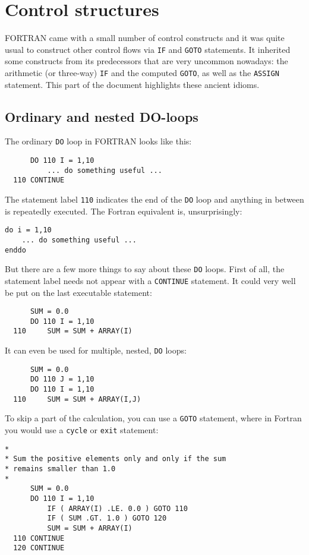 \section{Control structures}
FORTRAN came with a small number of control constructs and it was quite usual to construct
other control flows via \verb+IF+ and \verb+GOTO+ statements. It inherited some constructs
from its predecessors that are very uncommon nowadays: the arithmetic (or three-way) \verb+IF+ and the
computed \verb+GOTO+, as well as the \verb+ASSIGN+ statement. This part of the document
highlights these ancient idioms.

\subsection{Ordinary and nested DO-loops}
The ordinary \verb+DO+ loop in FORTRAN looks like this:
%
\begin{verbatim}
      DO 110 I = 1,10
          ... do something useful ...
  110 CONTINUE
\end{verbatim}
%
The statement label \verb+110+ indicates the end of the \verb+DO+ loop and anything in between
is repeatedly executed. The Fortran equivalent is, unsurprisingly:
%
\begin{verbatim}
do i = 1,10
    ... do something useful ...
enddo
\end{verbatim}
%
But there are a few more things to say about these \verb+DO+ loops. First of all, the
statement label needs not appear with a \verb+CONTINUE+ statement. It could very well be
put on the last executable statement:
%
\begin{verbatim}
      SUM = 0.0
      DO 110 I = 1,10
  110     SUM = SUM + ARRAY(I)
\end{verbatim}
%
It can even be used for multiple, nested, \verb+DO+ loops:
%
\begin{verbatim}
      SUM = 0.0
      DO 110 J = 1,10
      DO 110 I = 1,10
  110     SUM = SUM + ARRAY(I,J)
\end{verbatim}
%
To skip a part of the calculation, you can use a \verb+GOTO+ statement, where in Fortran
you would use a \verb+cycle+ or \verb+exit+ statement:
%
\begin{verbatim}
*
* Sum the positive elements only and only if the sum
* remains smaller than 1.0
*
      SUM = 0.0
      DO 110 I = 1,10
          IF ( ARRAY(I) .LE. 0.0 ) GOTO 110
          IF ( SUM .GT. 1.0 ) GOTO 120
          SUM = SUM + ARRAY(I)
  110 CONTINUE
  120 CONTINUE
\end{verbatim}

